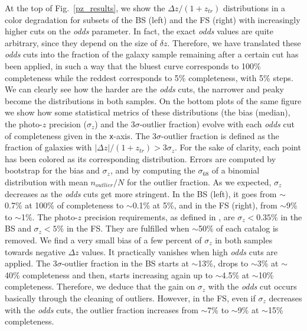 At the top of Fig.~\ref{pz_results}, we show the $\Delta z/(1+z_{tr})$ distributions in a color degradation for subsets of the BS (left) and the FS (right) with increasingly higher cuts on the \textit{odds} parameter. In fact, the exact \textit{odds} values are quite arbitrary, since they depend on the size of $\delta z$. Therefore, we have translated these \textit{odds} cuts into the fraction of the galaxy sample remaining after a certain cut has been applied, in such a way that the bluest curve corresponds to 100\% completeness while the reddest corresponds to 5\% completeness, with 5\% steps. We can clearly see how the harder are the \textit{odds} cuts, the narrower and peaky become the distributions in both samples. On the bottom plots of the same figure we show how some statistical metrics of these distributions (the bias (median), the photo-$z$ precision ($\sigma_z$) and the $3\sigma$-outlier fraction) evolve with each \textit{odds} cut of completeness given in the \texttt{x}-axis. The $3\sigma$-outlier fraction is defined as the fraction of galaxies with $|\Delta z|/(1+z_{tr})>3\sigma_z$. For the sake of clarity, each point has been colored as its corresponding distribution. Errors are computed by bootstrap \citep{efron79} for the bias and $\sigma_z$, and by computing the $\sigma_{68}$ of a binomial distribution with mean $n_{outlier} / N$ for the outlier fraction. As we expected, $\sigma_z$ decreases as the \textit{odds} cuts get more stringent. In the BS (left), it goes from $\sim$0.7\% at 100\% of completeness to $\sim$0.1\% at 5\%, and in the FS (right), from $\sim$9\% to $\sim$1\%. The photo-$z$ precision requirements, as defined in \citet{Gaztanaga2012}, are $\sigma_z < 0.35\%$ in the BS and $\sigma_z < 5\%$ in the FS. They are fulfilled when $\sim$50\% of each catalog is removed. We find a very small bias of a few percent of $\sigma_z$ in both samples towards negative $\Delta z$ values. It practically vanishes when high \textit{odds} cuts are applied. The $3\sigma$-outlier fraction in the BS starts at $\sim$13\%, drops to $\sim$3\% at $\sim$40\% completeness and then, starts increasing again up to $\sim$4.5\% at $\sim$10\% completeness. Therefore, we deduce that the gain on $\sigma_z$ with the \textit{odds} cut occurs basically through the cleaning of outliers. However, in the FS, even if $\sigma_z$ decreases with the \textit{odds} cuts, the outlier fraction increases from $\sim$7\% to $\sim$9\% at $\sim$15\% completeness. 

